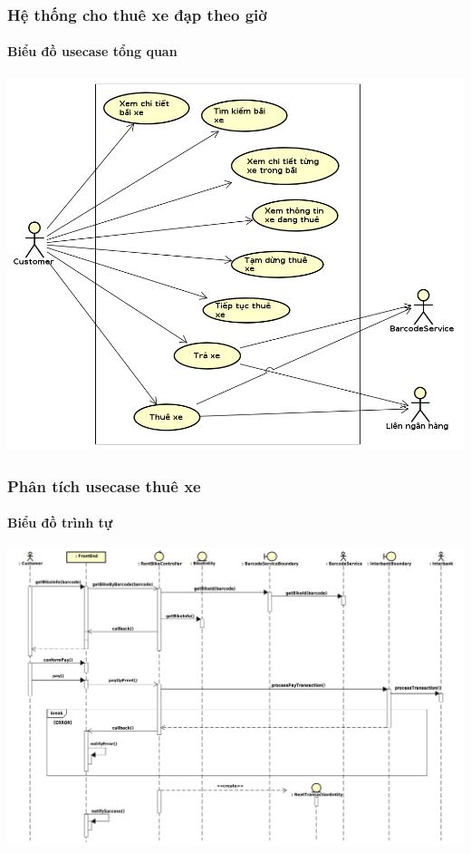 \documentclass[11pt]{beamer}
\begin{document}
\begin{frame}[plain]
	\frametitle{Hệ thống cho thuê xe đạp theo giờ}
	\framesubtitle{Biểu đồ usecase tổng quan}
	\includegraphics[scale=.35]{Images/Overview.png}
\end{frame}
\begin{frame}[plain]
	\frametitle{Phân tích usecase thuê xe}
	\framesubtitle{Biểu đồ trình tự}
	\hspace*{-.1 in}\includegraphics[scale=.25]{Images/RentBike.png}
\end{frame}
\end{document}

